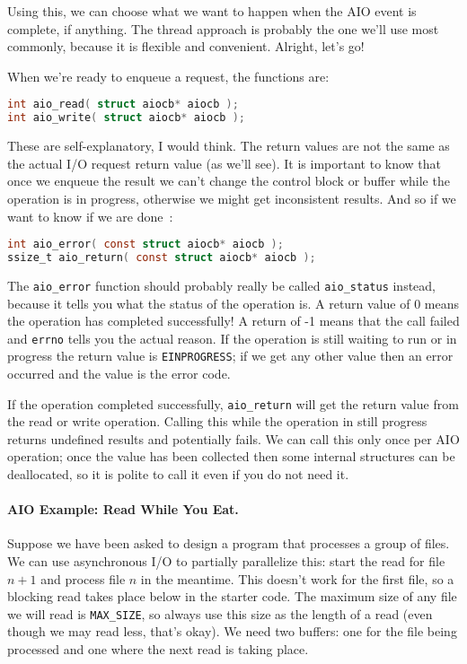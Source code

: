 Using this, we can choose what we want to happen when the AIO event is complete, if anything. The thread approach is probably the one we'll use most commonly, because it is flexible and convenient. Alright, let's go! 

When we're ready to enqueue a request, the functions are:
\begin{lstlisting}[language=C]
int aio_read( struct aiocb* aiocb );
int aio_write( struct aiocb* aiocb );
\end{lstlisting}

These are self-explanatory, I would think. The return values are not the same as the actual I/O request return value (as we'll see). It is important to know that once we enqueue the result we can't change the control block or buffer while the operation is in progress, otherwise we might get inconsistent results. And so if we want to know if we are done~\cite{apunix}:

\begin{lstlisting}[language=C]
int aio_error( const struct aiocb* aiocb );
ssize_t aio_return( const struct aiocb* aiocb );
\end{lstlisting}

The \texttt{aio\_error} function should probably really be called \texttt{aio\_status} instead, because it tells you what the status of the operation is. A return value of 0 means the operation has completed successfully! A return of -1 means that the call failed and \texttt{errno} tells you the actual reason. If the operation is still waiting to run or in progress the return value is \texttt{EINPROGRESS}; if we get any other value then an error occurred and the value is the error code.

If the operation completed successfully, \texttt{aio\_return} will get the return value from the read or write operation. Calling this while the operation in still progress returns undefined results and potentially fails. We can call this only once per AIO operation; once the value has been collected then some internal structures can be deallocated, so it is polite to call it even if you do not need it.

\paragraph{AIO Example: Read While You Eat.}

Suppose we have been asked to design a program that processes a group of files. We can use asynchronous I/O to partially parallelize this: start the read for file $n+1$ and process file $n$ in the meantime. This doesn't work for the first file, so a blocking read takes place below in the starter code. The maximum size of any file we will read is \texttt{MAX\_SIZE}, so always use this size as the length of a read (even though we may read less, that's okay). We need two buffers: one for the file being processed and one where the next read is taking place.

